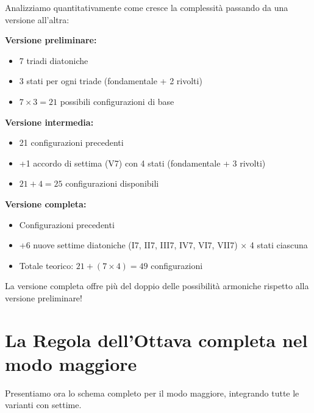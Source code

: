\begin{matematica}
	Analizziamo quantitativamente come cresce la complessità passando da una versione all'altra:
	
	\textbf{Versione preliminare:}
	\begin{itemize}
		\item 7 triadi diatoniche
		\item 3 stati per ogni triade (fondamentale + 2 rivolti)
		\item $7 \times 3 = 21$ possibili configurazioni di base
	\end{itemize}
	
	\textbf{Versione intermedia:}
	\begin{itemize}
		\item 21 configurazioni precedenti
		\item +1 accordo di settima (V7) con 4 stati (fondamentale + 3 rivolti)
		\item $21 + 4 = 25$ configurazioni disponibili
	\end{itemize}
	
	\textbf{Versione completa:}
	\begin{itemize}
		\item Configurazioni precedenti
		\item +6 nuove settime diatoniche (I7, II7, III7, IV7, VI7, VII7) × 4 stati ciascuna
		\item Totale teorico: $21 + (7 \times 4) = 49$ configurazioni
	\end{itemize}
	
	La versione completa offre più del doppio delle possibilità armoniche rispetto alla versione preliminare!
\end{matematica}

\section{La Regola dell'Ottava completa nel modo maggiore}
\label{sec:regola_completa_maggiore}

Presentiamo ora lo schema completo per il modo maggiore, integrando tutte le varianti con settime.

